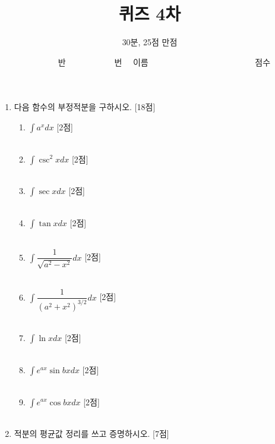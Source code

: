\documentclass[12pt, a4paper]{article}
\title{퀴즈 4차}
\author{30분, 25점 만점}
\date{\ \ \ \ \ \ \ 반 \ \ \ \ \ \ \ \ \ \ \ 번 \ \ 이름 \ \ \ \ \ \ \ \ \ \ \ \ \ \ \ \ \ \ \ \ \ \ \ \ \ 점수}
\begin{document}
\maketitle 
\begin{enumerate}
    \item  다음 함수의 부정적분을 구하시오. [18점]
    \begin{enumerate} [label=(\arabic*), leftmargin=8mm, nosep]
        \item $\displaystyle \int a^x dx$ [2점] \\ \\
        \item $\displaystyle \int \csc^2 x dx$ [2점]\\ \\
        \item $\displaystyle \int \sec x dx$ [2점]\\ \\
        \item $\displaystyle \int \tan x dx$ [2점]\\ \\
        \item $\displaystyle \int \dfrac{1}{\sqrt{a^2 - x^2}} dx$ [2점]\\ \\
        \item $\displaystyle \int \dfrac{1}{(a^2 + x^2)^{3/2}}dx$ [2점]\\ \\
        \item $\displaystyle \int \ln x dx$ [2점]\\ \\
        \item $\displaystyle \int e^{ax} \sin bx dx$ [2점]\\ \\
        \item $\displaystyle \int e^{ax} \cos bx dx$ [2점]\\ \\
    \end{enumerate} 

    \newpage %
    \item 적분의 평균값 정리를 쓰고 증명하시오. [7점] \\ \\ \\ \\ \\ \\


\end{enumerate}
\end{document}
